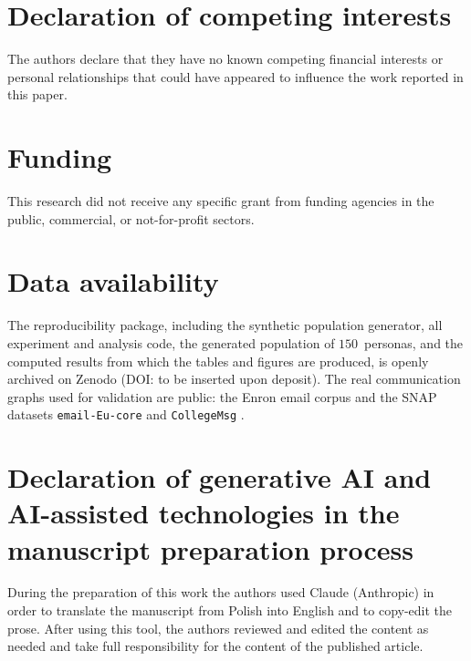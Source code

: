 \documentclass[a4paper,fleqn]{cas-sc}
\begin{document}
\section*{Declaration of competing interests}
The authors declare that they have no known competing financial interests or personal relationships
that could have appeared to influence the work reported in this paper.

\section*{Funding}
This research did not receive any specific grant from funding agencies in the public, commercial,
or not-for-profit sectors.

\section*{Data availability}
The reproducibility package, including the synthetic population generator, all experiment and analysis code, the generated population of $150$~personas, and the computed results from which the tables and figures are produced, is openly archived on Zenodo (DOI: to be inserted upon deposit). The real
communication graphs used for validation are public: the Enron email corpus \citep{klimt2004enron}
and the SNAP datasets \texttt{email-Eu-core} and \texttt{CollegeMsg} \citep{leskovec2014snap}.

\section*{Declaration of generative AI and AI-assisted technologies in the manuscript preparation process}
During the preparation of this work the authors used Claude (Anthropic) in order to translate the
manuscript from Polish into English and to copy-edit the prose. After using this tool, the authors
reviewed and edited the content as needed and take full responsibility for the content of the
published article.

\clearpage


\end{document}

